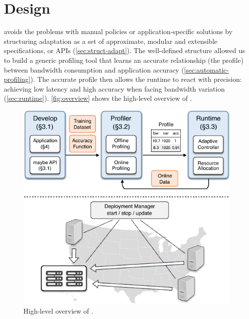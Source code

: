 \section{\sysname{} Design}
\label{sec:system}

\sysname{} avoids the problems with manual policies or application-specific
solutions by structuring adaptation as a set of approximate, modular and
extensible specifications, or APIs (\autoref{sec:struct-adapt}). The
well-defined structure allowed us to build a generic profiling tool that learns
an accurate relationship (the profile) between bandwidth consumption and
application accuracy (\autoref{sec:automatic-profiling}). The accurate profile
then allows the runtime to react with precision: achieving low latency and high
accuracy when facing bandwidth variation
(\autoref{sec:runtime}). \autoref{fig:overview} shows the high-level overview of
\sysname{}.

\begin{figure}
  \centering
  \includegraphics[width=0.8\linewidth]{figures/system.pdf}
  \caption{High-level overview of \sysname{}.}
  \label{fig:overview}
\end{figure}





